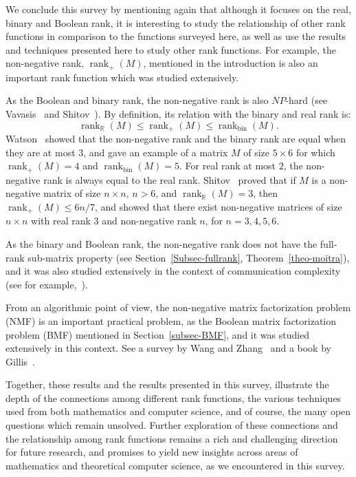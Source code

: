 \documentclass[11pt]{article}
\newcommand{\rank}{\mathop{\mathrm{rank}}}
\newcommand{\Rbin}{{\rank}_{\mathrm{bin}}}
\newcommand{\Rreal}{{\rank}_\mathbb{R}}
\newcommand{\Rnon}{{\rank}_{+}}
\begin{document}
{{We conclude this survey by mentioning again that although it focuses on the real, binary and Boolean rank,
it is interesting to study the relationship of other rank functions in comparison to the functions surveyed here,
as well as use the results and techniques presented here to study other rank functions.
For example, the  non-negative rank, $\Rnon(M)$, mentioned in the introduction is also an important rank function which was studied extensively.

As the Boolean and binary rank, the non-negative rank  is also $NP$-hard (see Vavasis~\cite{vavasis2010complexity} and Shitov~\cite{shitov2017nonnegative}).
By definition, its relation with the binary and real rank is:
$$\Rreal(M) \leq \Rnon(M) \leq \Rbin(M).$$
Watson~\cite{watson2016nonnegative} showed that the non-negative rank and the binary rank are equal when they are at most $3$,
and gave an example of a matrix $M$ of size $5 \times 6$ for which $\Rnon(M) = 4$ and  $\Rbin(M) = 5$.
For real rank at most $2$, the non-negative rank is always equal to the real rank.
Shitov~\cite{shitov2014upper} proved that if $M$ is a non-negative matrix of size $n \times n$, $n > 6$,
and $\Rreal(M) = 3$, then $\Rnon(M) \leq 6n/7$, and showed that
there exist non-negative matrices of size $n \times n$ with real rank $3$ and non-negative rank $n$, for $n = 3,4,5,6$.

As the binary and Boolean rank, the non-negative rank does not have the full-rank sub-matrix property (see Section~\ref{Subsec-fullrank}, Theorem~\ref{theo-moitra}),
and it was also studied extensively in the context of communication complexity (see for example,~\cite{Yannakakis91,kol2014approximate, faenza2015extended}).

From an algorithmic point of view, the non-negative matrix factorization problem (NMF) is an
important practical problem, as the Boolean matrix factorization problem (BMF) mentioned in Section~\ref{subsec-BMF},
and it was studied extensively in this context.
See a survey by Wang and Zhang~\cite{wang2012nonnegative} and a book by Gillis~\cite{gillis2020nonnegative}.

Together, these results and the results presented in this survey, illustrate the depth of the connections among different rank functions,
the various techniques used from both mathematics and computer science, and of course, the many open questions which remain unsolved.
Further exploration of these connections and the relationship among rank functions remains a rich and challenging direction for future research, and
promises to yield new insights across areas of mathematics and theoretical computer science, as we encountered in this survey.

}}
\end{document}
